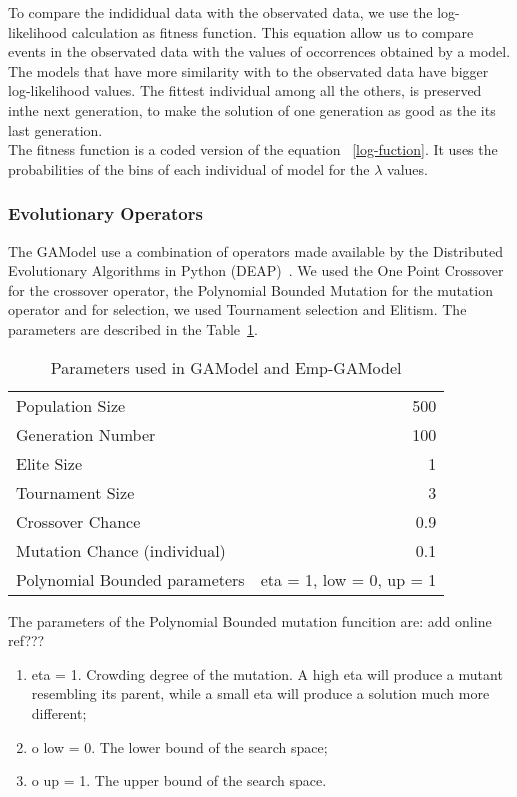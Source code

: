 To compare the indididual data with the observated data, we use the log-likelihood calculation as fitness function. This equation allow us to compare events in the observated data with the values of occorrences obtained by a model. The models that have more similarity with to the observated data have bigger log-likelihood values. The fittest individual among all the others, is preserved inthe next generation, to make the solution of one generation as good as the its last generation.\\

The fitness function is a coded version of the equation ~\ref{log-fuction}. It uses the probabilities of the bins of each individual of model for the $\lambda$ values.\\

\subsubsection{Evolutionary Operators}\label{gaOperators}
The GAModel use a combination of operators made available by the Distributed Evolutionary Algorithms in Python (DEAP)~\cite{DeRainville:2012:DPF:2330784.2330799}. We used the One Point Crossover for the crossover operator, the Polynomial Bounded Mutation for the mutation operator and for selection, we used Tournament selection and Elitism. The parameters are described in the Table~\ref{GAParameters}.

\begin{table}[!ht]
  \caption{Parameters used in GAModel and Emp-GAModel}
  \label{GAParameters}
  \begin{center}
  \begin{tabular}{|l|r|}
    \hline
    Population Size & 500\\
    Generation Number & 100\\
    Elite Size & 1\\
    Tournament Size & 3\\
    Crossover Chance & 0.9\\
    Mutation Chance (individual) & 0.1\\
	Polynomial Bounded parameters & eta = 1, low = 0, up = 1\\
    \hline    
  \end{tabular}
  \end{center}
\end{table}

The parameters of the Polynomial Bounded mutation funcition are: add online ref???
\begin{enumerate}
\item eta = 1. Crowding degree of the mutation. A high eta will produce a mutant resembling its parent, while a small eta will produce a solution much more different;
\item o low = 0. The lower bound of the search space;
\item o up = 1. The upper bound of the search space.
\end{enumerate}

